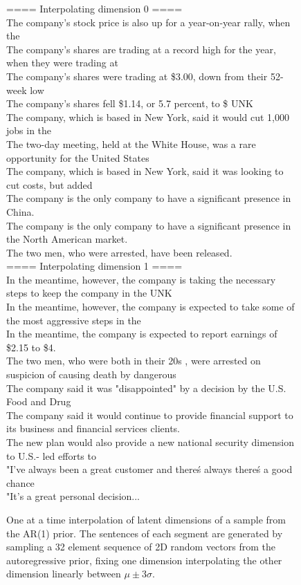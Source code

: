 \documentclass{article} \usepackage{iclr2019_conference,times}
\begin{document}
\begin{figure}[h!]
\centering
\begin{tcolorbox}

\small
====  Interpolating dimension 0 ====\\
\textup{The company's stock price is also up for a year-on-year rally, when the}\\
\textup{The company's shares are trading at a record high for the year, when they were trading at}\\
\textup{The company's shares were trading at \$3.00, down from their 52-week low}\\
\textup{The company's shares fell \$1.14, or 5.7 percent, to \$ UNK}\\
\textup{The company,  which is based in New York, said it would cut 1,000 jobs in the}\\
\textup{The two-day meeting, held at the White House, was a rare opportunity for the United States}\\
\textup{The company,  which is based in New York, said it was looking to cut costs,  but added}\\
\textup{The company is the only company to have a significant presence in China.}\\
\textup{The company is the only company to have a significant presence in the North American market.}\\
\textup{The two men, who were arrested, have been released.}\\

====  Interpolating dimension 1 ====\\
\textup{In the meantime, however, the company is taking the necessary steps to keep the company in the UNK}\\
\textup{In the meantime, however, the company is expected to take some of the most aggressive steps in the}\\
\textup{In the meantime, the company is expected to report earnings of \$2.15 to \$4.}\\
\textup{The two men, who were both in their 20s , were arrested on suspicion of causing death by dangerous}\\
\textup{The company said it was "disappointed" by a decision by the U.S. Food and Drug}\\
\textup{The company said it would continue to provide financial support to its business and financial services clients.}\\
\textup{The new plan would also provide a new national security dimension to U.S.- led efforts to}\\
\textup{"I've always been a great customer and there\'s always there\'s a good chance}\\
\textup{"It's a great personal decision...}\\
\end{tcolorbox}
\caption{One at a time interpolation of latent dimensions of a sample from the AR(1) prior.
         The sentences of each segment are generated by sampling a 32 element sequence of 2D random vectors from the autoregressive prior, fixing one dimension interpolating the other dimension linearly between $\mu \pm 3\sigma$.
         }\label{fig:txtint-ar}
\end{figure}
\end{document}
